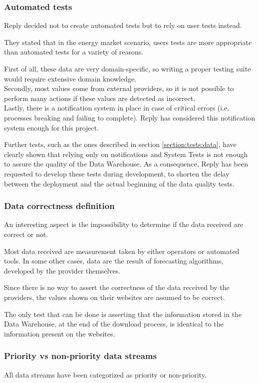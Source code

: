 \subsubsection{Automated tests}
    Reply decided not to create automated tests but to rely on user tests instead.
    
    They stated that in the energy market scenario, users tests are more appropriate than automated tests for a variety of reasons.
    
    First of all, these data are very domain-specific, so writing a proper testing suite would require extensive domain knowledge.\\
    Secondly, most values come from external providers, so it is not possible to perform many actions if these values are detected as incorrect.\\
    Lastly, there is a notification system in place in case of critical errors (i.e. processes breaking and failing to complete).
    Reply has considered this notification system enough for this project.
    
    Further tests, such as the ones described in section \ref{section:tests:data}, have clearly shown that relying only on notifications and System Tests is not enough to assure the quality of the Data Warehouse.
    As a consequence, Reply has been requested to develop these tests during development, to shorten the delay between the deployment and the actual beginning of the data quality tests.
    
\subsubsection{Data correctness definition}
    An interesting aspect is the impossibility to determine if the data received are correct or not.
    
    Most data received are measurement taken by either operators or automated tools.
    In some other cases, data are the result of forecasting algorithms, developed by the provider themselves.
    
    Since there is no way to assert the correctness of the data received by the providers, the values shown on their websites are assumed to be correct.
    
    The only test that can be done is asserting that the information stored in the Data Warehouse, at the end of the download process, is identical to the information present on the websites.
    
\subsubsection{Priority vs non-priority data streams}
    All data streams have been categorized as priority or non-priority.
    
